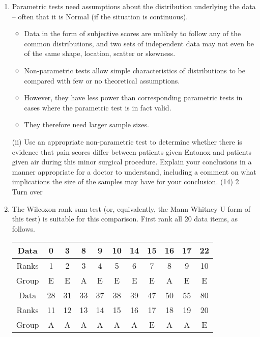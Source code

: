 \documentclass[a4paper,12pt]{article}
\begin{document}
\begin{enumerate} 
\item Parametric tests need assumptions about the distribution underlying the data  –  often that it is Normal (if the situation is continuous).  
\begin{itemize}
    \item Data in the form of subjective scores are unlikely to follow any of the common distributions, and two sets of independent data may not even be of the same shape, location, scatter or skewness. 
    \item Non-parametric tests allow simple characteristics of distributions to be compared with few or no theoretical assumptions.  
    \item However, they have less power than corresponding parametric tests in cases where the parametric test is in fact valid.  
    \item They therefore need larger sample sizes. 
\end{itemize}

\newpage
\begin{framed}
 (ii) Use an appropriate non-parametric test to determine whether there is evidence that pain scores differ between patients given Entonox and patients given air during this minor surgical procedure.  Explain your conclusions in a manner appropriate for a doctor to understand, including a comment on what implications the size of the samples may have for your conclusion. (14) 
2 
Turn over 
\end{framed}
 
\item  The Wilcoxon rank sum test (or, equivalently, the Mann Whitney U form of this test) is suitable for this comparison.  First rank all 20 data items, as follows. 
\begin{center}
\begin{tabular}{|c||c|c|c|c|c|c|c|c|c|c|}\hline
Data & 0 & 3 & 8 & 9 & 10&  14&  15&  16&  17&  22\\ \hline

Ranks & 1 & 2 & 3 & 4 & 5 & 6 & 7 & 8 & 9 & 10\\ \hline
Group &  E&  E&  A&  E & E&  E&  E&  A&  E&  E\\ \hline \hline
 
Data & 28&  31&  33&  37&  38 & 39&  47&  50&  55 & 80\\ \hline
Ranks & 11&  12&  13&  14&  15&  16&  17 & 18 & 19&  20\\ \hline 
Group& A& A& A& A&  A &A &E &A &A &E\\ \hline
\end{tabular}
 

\end{center}
\end{enumerate}
\end{document}
